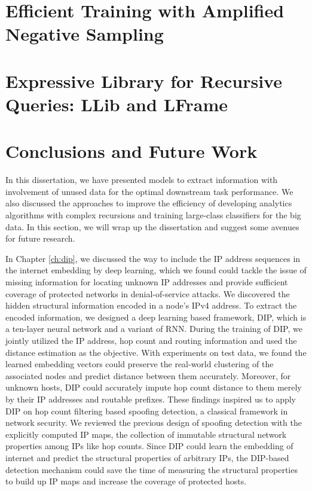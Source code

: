 \documentclass [PhD] {uclathes}
\begin{document}


\chapter{Efficient Training with Amplified Negative Sampling}
\label{ch:nec}


\chapter{Expressive Library for Recursive Queries: LLib and LFrame}
\label{ch:lib}




\chapter{Conclusions and Future Work}
\label{ch:con}

In this dissertation, we have presented models to extract information with involvement of unused data for the optimal downstream task performance. We also discussed the approaches to improve the efficiency of  developing analytics algorithms with complex recursions and training large-class classifiers for the big data. In this section, we will wrap up the dissertation and suggest some avenues for future research.

In Chapter \ref{ch:dip}, we discussed the way to include the IP address sequences in the internet embedding by deep learning, which we found could tackle the issue of missing information for locating unknown IP addresses and provide sufficient coverage of  protected networks in denial-of-service attacks. We discovered the hidden structural information encoded in a node's IPv4 address. To extract the encoded information, we designed a deep learning based framework, DIP, which is a ten-layer neural network and a variant of RNN. During the training of DIP, we jointly utilized the IP address, hop count and routing information and used the distance estimation as the objective. With experiments on  test data, we found the learned embedding vectors  could preserve the real-world clustering of the associated nodes and predict distance between them accurately. Moreover, for unknown hosts, DIP could accurately impute hop count distance to them merely by their IP addresses and routable prefixes. These findings inspired us to apply DIP on hop count filtering based spoofing detection, a classical framework in network security. We reviewed the previous design of spoofing detection with the explicitly computed IP maps, the collection of  immutable structural network properties  among IPs like hop counts.  Since DIP could learn the embedding of internet and predict the structural properties of arbitrary IPs, the DIP-based detection mechanism could save the time of measuring the structural properties to build up  IP maps and increase the coverage of protected hosts. 
\end{document}
